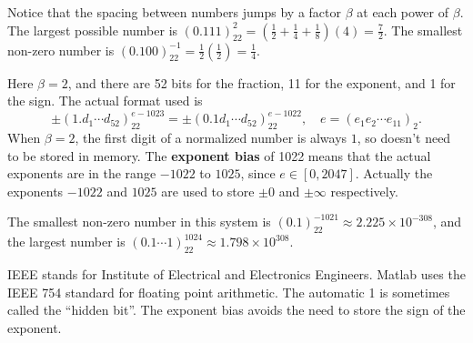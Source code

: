 \documentclass[
  letterpaper,
  DIV=11,
  numbers=noendperiod]{scrreprt}
\begin{document}
\begin{tcolorbox}[enhanced jigsaw, bottomtitle=1mm, title=\textcolor{quarto-callout-note-color}{\faInfo}\hspace{0.5em}{Note}, colback=white, opacityback=0, rightrule=.15mm, bottomrule=.15mm, colbacktitle=quarto-callout-note-color!10!white, colframe=quarto-callout-note-color-frame, arc=.35mm, breakable, coltitle=black, leftrule=.75mm, left=2mm, toptitle=1mm, toprule=.15mm, titlerule=0mm, opacitybacktitle=0.6]

Notice that the spacing between numbers jumps by a factor \(\beta\) at
each power of \(\beta\). The largest possible number is
\((0.111)_22^2 = (\tfrac12 + \tfrac14 + \tfrac18)(4) = \tfrac72\). The
smallest non-zero number is
\((0.100)_22^{-1}=\tfrac12(\tfrac12) = \tfrac14\).

\end{tcolorbox}

Here \(\beta=2\), and there are 52 bits for the fraction, 11 for the
exponent, and 1 for the sign. The actual format used is \[
\pm (1.d_1\cdots d_{52})_22^{e-1023} = \pm (0.1d_1\cdots d_{52})_22^{e-1022}, \quad e = (e_1e_2\cdots e_{11})_2.
\] When \(\beta=2\), the first digit of a normalized number is always
\(1\), so doesn't need to be stored in memory. The \textbf{exponent
bias} of 1022 means that the actual exponents are in the range \(-1022\)
to \(1025\), since \(e\in[0,2047]\). Actually the exponents \(-1022\)
and \(1025\) are used to store \(\pm 0\) and \(\pm\infty\) respectively.

The smallest non-zero number in this system is
\((0.1)_22^{-1021} \approx 2.225\times 10^{-308}\), and the largest
number is \((0.1\cdots 1)_22^{1024} \approx 1.798\times 10^{308}\).

\begin{tcolorbox}[enhanced jigsaw, bottomtitle=1mm, title=\textcolor{quarto-callout-note-color}{\faInfo}\hspace{0.5em}{Note}, colback=white, opacityback=0, rightrule=.15mm, bottomrule=.15mm, colbacktitle=quarto-callout-note-color!10!white, colframe=quarto-callout-note-color-frame, arc=.35mm, breakable, coltitle=black, leftrule=.75mm, left=2mm, toptitle=1mm, toprule=.15mm, titlerule=0mm, opacitybacktitle=0.6]

IEEE stands for Institute of Electrical and Electronics Engineers.
Matlab uses the IEEE 754 standard for floating point arithmetic. The
automatic 1 is sometimes called the ``hidden bit''. The exponent bias
avoids the need to store the sign of the exponent.

\end{tcolorbox}
\end{document}
